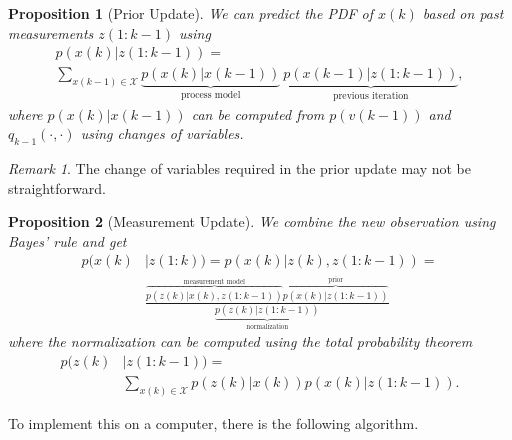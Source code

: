 \documentclass[margin=tiny]{hsrzf}
\theoremstyle{plain}
\newtheorem{prop}{Proposition}[section]
\theoremstyle{definition}
\theoremstyle{remark}
\newtheorem*{remark}{Remark}
\begin{document}
\begin{prop}[Prior Update]
  We can predict the PDF of $x(k)$ based on past measurements $z(1:k-1)$ using
  \begin{gather*}
    p(x(k)|z(1:k-1)) = \\
      \sum_{x(k-1) \in \mathcal{X}}
      \underbrace{p(x(k) | x(k-1))}_{\text{process model}} ~
      \underbrace{p(x(k-1) | z(1:k-1))}_{\text{previous iteration}},
  \end{gather*}
  where $p(x(k) | x(k-1))$ can be computed from $p(v(k-1))$ and
  $q_{k-1}(\cdot, \cdot)$ using changes of variables.
\end{prop}

\begin{remark}
  The change of variables required in the prior update may not be
  straightforward.
\end{remark}

\begin{prop}[Measurement Update]
  We combine the new observation using Bayes' rule and get
  \begin{align*}
    p(x(k) &| z(1:k)) = p(x(k) | z(k), z(1:k-1)) = \\
      &\frac{
        \overbrace{p(z(k) | x(k), z(1:k-1))}^{\text{measurement model}}
        \overbrace{p(x(k) | z(1:k-1))}^{\text{prior}}
      }{\underbrace{p(z(k) | z(1:k-1))}_\text{normalization}}
  \end{align*}
  where the normalization can be computed using the total probability theorem
  \begin{align*}
    p(z(k) &| z(1:k-1)) =  \\
      &\sum_{x(k) \in \mathcal{X}} p(z(k) | x(k)) p(x(k) | z(1: k-1)).
  \end{align*}
\end{prop}

To implement this on a computer, there is the following algorithm.
\end{document}
